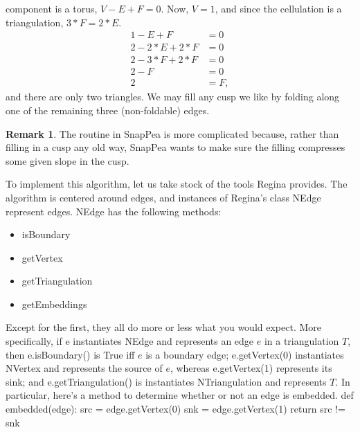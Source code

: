 \documentclass[10pt,twocolumn]{article}%
\theoremstyle{definition}
\newtheorem{Rmk}[Thm]{Remark}
\begin{document}
component is a torus, $V - E + F = 0$.
Now, $V = 1$, and since the cellulation is
a triangulation, $3*F = 2*E$.
\begin{align*}
1 - E + F &= 0 \\
2 - 2*E + 2*F &= 0\\
2 - 3*F + 2*F &= 0\\
2 - F &= 0\\
2 &= F,
\end{align*}
and there are only two triangles. We may
fill any cusp we like by folding along
one of the remaining three (non-foldable) edges.
\nwenddocs{}\nwdocspar
\begin{Rmk}
The routine in {\Tt{}SnapPea\nwendquote} is more complicated
because, rather than filling in a cusp any old way,
{\Tt{}SnapPea\nwendquote} wants to make sure the filling compresses
some given slope in the cusp.
\end{Rmk}
\nwenddocs{}\nwdocspar
To implement this algorithm,
let us take stock of the tools {\Tt{}Regina\nwendquote} provides.
\nwenddocs{}\nwdocspar
The algorithm is centered around edges,
and instances of {\Tt{}Regina\nwendquote}'s class {\Tt{}NEdge\nwendquote} represent
edges. {\Tt{}NEdge\nwendquote} has the following methods:
\begin{itemize}
\item {\Tt{}isBoundary\nwendquote}
\item {\Tt{}getVertex\nwendquote}
\item {\Tt{}getTriangulation\nwendquote}
\item {\Tt{}getEmbeddings\nwendquote}
\end{itemize}
Except for the first, they all do more or less
what you would expect. More specifically, if
{\Tt{}e\nwendquote} instantiates {\Tt{}NEdge\nwendquote} and represents
an edge $e$ in a triangulation $T$, then
{\Tt{}e.isBoundary()\nwendquote} is {\Tt{}True\nwendquote} iff $e$
is a boundary edge; {\Tt{}e.getVertex(0)\nwendquote} instantiates
{\Tt{}NVertex\nwendquote} and represents
the source of $e$, whereas {\Tt{}e.getVertex(1)\nwendquote}
represents its sink; and {\Tt{}e.getTriangulation()\nwendquote} is
instantiates {\Tt{}NTriangulation\nwendquote} and represents $T$.
\nwenddocs{}\nwdocspar
In particular, here's a method to determine
whether or not an edge is embedded.
\nwenddocs{}\endmoddef\nwstartdeflinemarkup\nwenddeflinemarkup
def embedded(edge):
  src = edge.getVertex(0)
  snk = edge.getVertex(1)
  return src != snk
\end{document}
